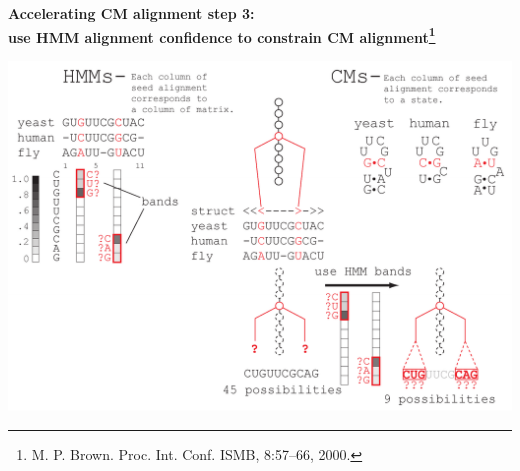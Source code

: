 \documentclass[landscape]{slides}
\begin{document}
\begin{slide}
\begin{center}

\textbf{Accelerating CM alignment step 3: \\ use HMM alignment
  confidence to constrain CM alignment\footnote{M. P. Brown. Proc. Int. Conf. ISMB, 8:57–66, 2000.}}
\end{center}
\medskip
\small
\begin{center}
\includegraphics[width=8in]{figs/post_hmm_to_cm_map2_layer16}
\end{center}
\vfill
\end{slide}
\begin{slide}
\end{slide}
\end{document}

